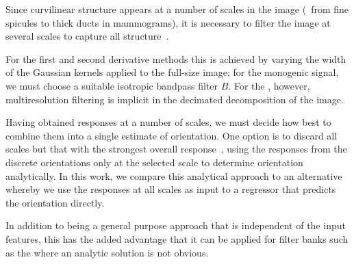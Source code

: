 \label{s:filtering_multiscale}
%
Since curvilinear structure appears at a number of scales in the image (\eg~from fine spicules to thick ducts in mammograms), it is necessary to filter the image at several scales to capture all structure~\cite{Lindeberg_IJCV98b}. 

For the first and second derivative methods this is achieved by varying the width of the Gaussian kernels applied to the full-size image; for the monogenic signal, we must choose a suitable isotropic bandpass filter $B$. For the \dtcwt{}, however, multiresolution filtering is implicit in the decimated decomposition of the image.

Having obtained responses at a number of scales, we must decide how best to combine them into a single estimate of orientation. One option is to discard all scales but that with the strongest overall response~\cite{Karssemeijer_teBrake_TMI96}, using the responses from the discrete orientations only at the selected scale to determine orientation analytically. In this work, we compare this analytical approach to an alternative whereby we use the responses at all scales as input to a regressor that predicts the orientation directly. 

In addition to being a general purpose approach that is independent of the input features, this has the added advantage that it can be applied for filter banks such as the \dtcwt{} where an analytic solution is not obvious.